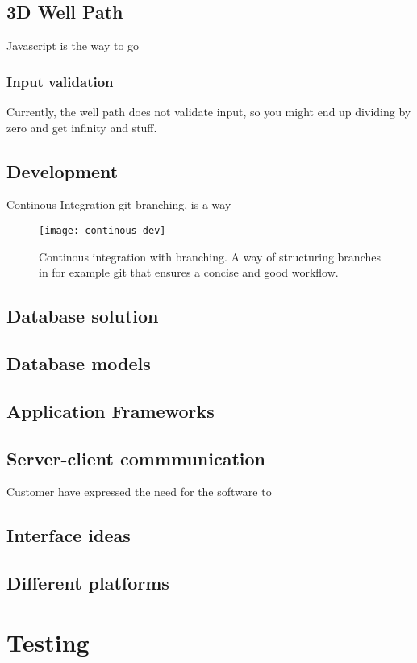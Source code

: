\documentclass{report}
\begin{document}
\subsection{3D Well Path}
Javascript is the way to go
\subsubsection{Input validation}
Currently, the well path does not validate input, so you might end up dividing by zero and get infinity and stuff. 
\subsection{Development} \label{sec:development}
Continous Integration git branching, is a way 

\begin{figure}
    \centering
    \texttt{[image: continous\_dev]}
    \caption{Continous integration with branching. A way of structuring branches in for example git that ensures a concise and good workflow. \label{fig:continous_dev}}
\end{figure}

\subsection{Database solution}
\subsection{Database models}
\subsection{Application Frameworks}
\subsection{Server-client commmunication}
Customer have expressed the need for the software to 
\subsection{Interface ideas}
\subsection{Different platforms}
\newpage
\section{Testing} \label{sec:testing}
\newpage
\end{document}
